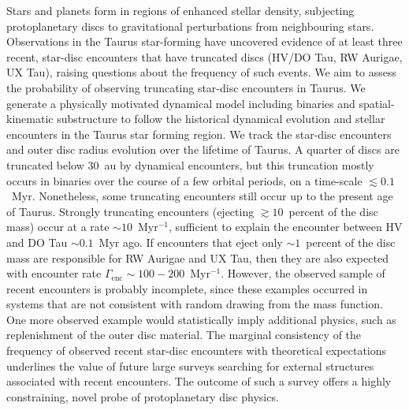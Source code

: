 \documentclass{aa}
\begin{document}
  \abstract
  {Stars and planets form in regions of enhanced stellar density, subjecting protoplanetary discs to gravitational perturbations from neighbouring stars. Observations in the Taurus star-forming have uncovered evidence of at least three recent, star-disc encounters that have truncated discs (HV/DO Tau, RW Aurigae, UX Tau), raising questions about the frequency of such events.}
   {We aim to assess the probability of observing truncating star-disc encounters in Taurus. }
   {We generate a physically motivated dynamical model including binaries and spatial-kinematic substructure to follow the historical dynamical evolution and stellar encounters in the Taurus star forming region. We track the star-disc encounters and outer disc radius evolution over the lifetime of Taurus.}
   {A quarter of discs are truncated below 30~au by dynamical encounters, but this truncation mostly occurs in binaries over the course of a few orbital periods, on a time-scale $\lesssim 0.1$~Myr. Nonetheless, some truncating encounters still occur up to the present age of Taurus. Strongly truncating encounters (ejecting $\gtrsim 10$~percent of the disc mass) occur at a rate $\sim 10$~Myr$^{-1}$, sufficient to explain the encounter between HV and DO Tau $\sim 0.1$~Myr ago. If encounters that eject only $\sim 1$~percent of the disc mass are responsible for RW Aurigae and UX Tau, then they are also expected with encounter rate $\Gamma_\mathrm{enc} \sim 100{-}200$~Myr$^{-1}$. However, the observed sample of recent encounters is probably incomplete, since these examples occurred in systems that are not consistent with random drawing from the mass function. One more observed example would statistically imply additional physics, such as replenishment of the outer disc material.}
   {The marginal consistency of the frequency of observed recent star-disc encounters with theoretical expectations underlines the value of future large surveys searching for external structures associated with recent encounters. The outcome of such a survey offers a highly constraining, novel probe of protoplanetary disc physics. }



    \maketitle
%
\end{document}

